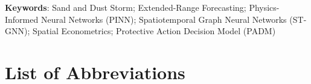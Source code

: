 \documentclass[12pt,a4paper,openany,twoside]{book}
\begin{document}
\vspace{1.5em}
\noindent \textbf{Keywords}: Sand and Dust Storm; Extended-Range Forecasting; Physics-Informed Neural Networks (PINN); Spatiotemporal Graph Neural Networks (ST-GNN); Spatial Econometrics; Protective Action Decision Model (PADM)

\cleardoublepage
\tableofcontents

\cleardoublepage
\listoffigures
{}

\cleardoublepage
\listoftables
{}

\cleardoublepage
\chapter*{List of Abbreviations}
\end{document}
